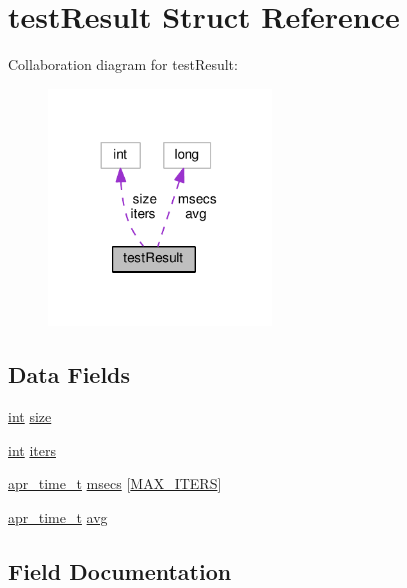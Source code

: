 \hypertarget{structtestResult}{}\section{test\+Result Struct Reference}
\label{structtestResult}


Collaboration diagram for test\+Result\+:
\nopagebreak
\begin{figure}[H]
\begin{center}
\leavevmode
\includegraphics[width=168pt]{structtestResult__coll__graph}
\end{center}
\end{figure}
\subsection*{Data Fields}
\begin{DoxyCompactItemize}
\item 
\hyperlink{pcre_8txt_a42dfa4ff673c82d8efe7144098fbc198}{int} \hyperlink{structtestResult_ab27c1fa625ffceb52ab42419d4530184}{size}
\item 
\hyperlink{pcre_8txt_a42dfa4ff673c82d8efe7144098fbc198}{int} \hyperlink{structtestResult_a4c897ff41ed805006f004a102feadada}{iters}
\item 
\hyperlink{group__apr__time_gadb4bde16055748190eae190c55aa02bb}{apr\+\_\+time\+\_\+t} \hyperlink{structtestResult_add970ab6e22eca4b2c2d252a0292d62d}{msecs} \mbox{[}\hyperlink{sockperf_8c_a0ea0040e87eeb2a4c9605ebc4959315e}{M\+A\+X\+\_\+\+I\+T\+E\+RS}\mbox{]}
\item 
\hyperlink{group__apr__time_gadb4bde16055748190eae190c55aa02bb}{apr\+\_\+time\+\_\+t} \hyperlink{structtestResult_a314c3958522e08f8966a7a7f44267f58}{avg}
\end{DoxyCompactItemize}


\subsection{Field Documentation}
